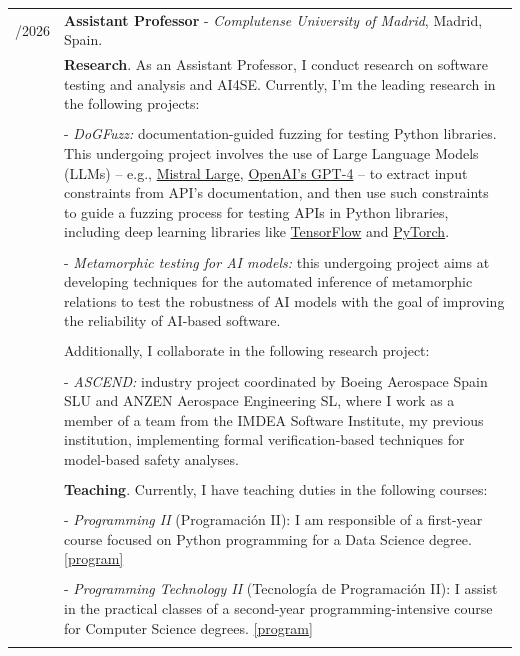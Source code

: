 \documentclass[a4paper,10pt]{article} %
\begin{document}
\begin{longtable}{>{\raggedleft\arraybackslash}p{} p{}}

2025/2026 & \textbf{Assistant Professor} - \textit{Complutense University of Madrid}, Madrid, Spain. \\  
& \textbf{Research}. As an Assistant Professor, I conduct research on software testing and analysis and AI4SE. Currently, I'm the leading research in the following projects: \\ & \\
& - \textit{DoGFuzz:} documentation-guided fuzzing for testing Python libraries. This undergoing project involves the use of Large Language Models (LLMs) -- e.g., \href{https://mistral.ai/news/mistral-large}{Mistral Large}, \href{https://openai.com/index/gpt-4/}{OpenAI's GPT-4} -- to extract input constraints from API's documentation, and then use such constraints to guide a fuzzing process for testing APIs in Python libraries, including 
deep learning libraries
like \href{https://www.tensorflow.org/}{TensorFlow} and \href{https://pytorch.org/}{PyTorch}. \\ & \\
& - \textit{Metamorphic testing for AI models:} this undergoing project aims at developing techniques for the automated inference of metamorphic relations to test the robustness of AI models with the goal of improving the reliability of AI-based software. \\ & \\
& Additionally, I collaborate in the following research project: \\ & \\
& - \textit{ASCEND:} industry project coordinated by Boeing Aerospace Spain SLU and ANZEN Aerospace Engineering SL, where I work as a member of a team from the IMDEA Software Institute, my previous institution, implementing formal verification-based techniques for model-based safety analyses. \\ & \\
& \textbf{Teaching}. Currently, I have teaching duties in the following courses: \\ & \\
& - \textit{Programming II} (Programación II): I am responsible of a first-year course focused on Python programming for a Data Science degree. \href{https://estudiosestadisticos.ucm.es/estudios/grado-cienciadelosdatosaplicada-plan-806299}{[program]} \\ & \\
& - \textit{Programming Technology II} (Tecnología de Programación II): I assist in the practical classes of
a second-year programming-intensive course for Computer Science degrees. \href{https://informatica.ucm.es/estudios/grado-adeinginformatica-plan-901981}{[program]} \\ & \\


\end{longtable}
\end{document}
